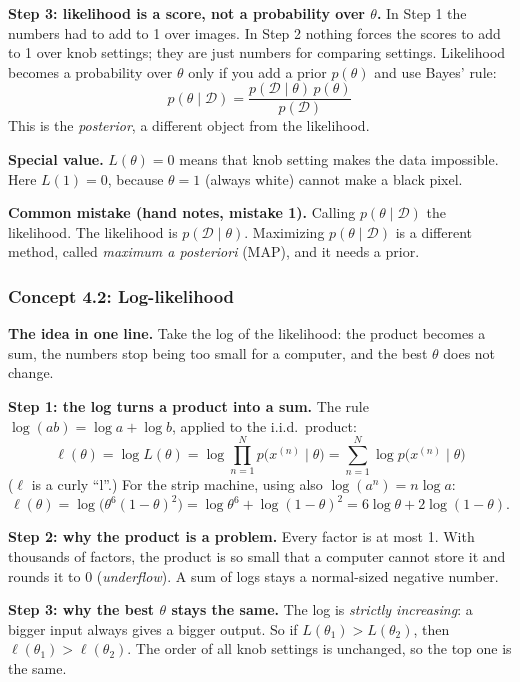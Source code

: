 \documentclass[12pt,a4paper]{article}
\begin{document}
\textbf{Step 3: likelihood is a score, not a probability over $\theta$.} In Step 1 the numbers had to add to 1 over images. In Step 2 nothing forces the scores to add to 1 over knob settings; they are just numbers for comparing settings. Likelihood becomes a probability over $\theta$ only if you add a prior $p(\theta)$ and use Bayes' rule:
\[
p(\theta\mid\mathcal{D})=\frac{p(\mathcal{D}\mid\theta)\,p(\theta)}{p(\mathcal{D})}
\]
This is the \emph{posterior}, a different object from the likelihood.

\textbf{Special value.} $L(\theta)=0$ means that knob setting makes the data impossible. Here $L(1)=0$, because $\theta=1$ (always white) cannot make a black pixel.

\textbf{Common mistake (hand notes, mistake 1).} Calling $p(\theta\mid\mathcal{D})$ the likelihood. The likelihood is $p(\mathcal{D}\mid\theta)$. Maximizing $p(\theta\mid\mathcal{D})$ is a different method, called \emph{maximum a posteriori} (MAP), and it needs a prior.

\subsubsection{Concept 4.2: Log-likelihood}\label{c4-2}

\textbf{The idea in one line.} Take the log of the likelihood: the product becomes a sum, the numbers stop being too small for a computer, and the best $\theta$ does not change.

\textbf{Step 1: the log turns a product into a sum.} The rule $\log(ab)=\log a+\log b$, applied to the i.i.d.\ product:
\[
\ell(\theta)=\log L(\theta)=\log\prod_{n=1}^{N}p\big(x^{(n)}\mid\theta\big)=\sum_{n=1}^{N}\log p\big(x^{(n)}\mid\theta\big)
\]
($\ell$ is a curly ``l''.) For the strip machine, using also $\log(a^n)=n\log a$:
\[
\ell(\theta)=\log\big(\theta^6(1-\theta)^2\big)=\log\theta^6+\log(1-\theta)^2=6\log\theta+2\log(1-\theta).
\]

\textbf{Step 2: why the product is a problem.} Every factor is at most 1. With thousands of factors, the product is so small that a computer cannot store it and rounds it to 0 (\emph{underflow}). A sum of logs stays a normal-sized negative number.

\textbf{Step 3: why the best $\theta$ stays the same.} The log is \emph{strictly increasing}: a bigger input always gives a bigger output. So if $L(\theta_1)>L(\theta_2)$, then $\ell(\theta_1)>\ell(\theta_2)$. The order of all knob settings is unchanged, so the top one is the same.
\end{document}
